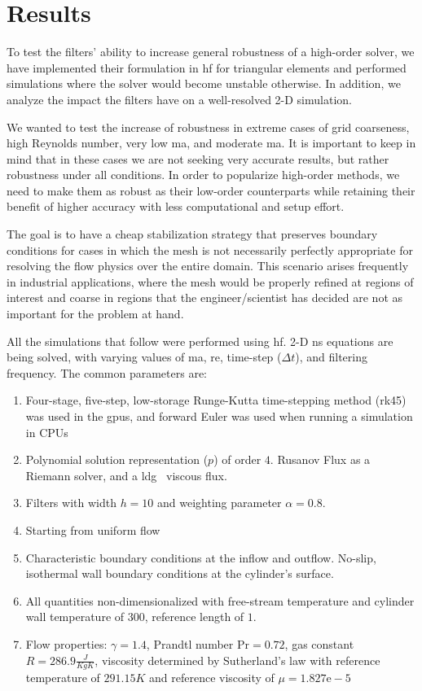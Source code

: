 \section{Results}
\label{sec:results}
To test the filters' ability to increase general robustness of a high-order solver, we have implemented their formulation in \gls{hf} for triangular elements and performed simulations where the solver would become unstable otherwise. In addition, we analyze the impact the filters have on a well-resolved 2-D simulation.

We wanted to test the increase of robustness in extreme cases of grid coarseness, high Reynolds number, very low \gls{ma}, and moderate \gls{ma}. It is important to keep in mind that in these cases we are not seeking very accurate results, but rather robustness under all conditions. In order to popularize high-order methods, we need to make them as robust as their low-order counterparts while retaining their benefit of higher accuracy with less computational and setup effort.

The goal is to have a cheap stabilization strategy that preserves boundary conditions for cases in which the mesh is not necessarily perfectly appropriate for resolving the flow physics over the entire domain. This scenario arises frequently in industrial applications, where the mesh would be properly refined at regions of interest and coarse in regions that the engineer/scientist has decided are not as important for the problem at hand.

All the simulations that follow were performed using \gls{hf}\cite{lopez2014verification}. 2-D \gls{ns} equations are being solved, with varying values of \gls{ma}, \gls{re}, time-step ($\Delta t$), and filtering frequency. The common parameters are:
\begin{enumerate}[1.]
\item Four-stage, five-step, low-storage Runge-Kutta time-stepping method (\gls{rk45}) \cite{carpenter1994fourth} was used in the \gls{gpu}s, and forward Euler was used when running a simulation in CPUs
\item Polynomial solution representation ($p$) of order $4$. Rusanov Flux as a Riemann solver, and a \gls{ldg}~\cite{cockburn1998local} viscous flux.
\item Filters with width $h = 10$ and weighting parameter $\alpha = 0.8$.
\item Starting from uniform flow
\item Characteristic boundary conditions at the inflow and outflow. No-slip, isothermal wall boundary conditions at the cylinder's surface.
\item All quantities non-dimensionalized with free-stream temperature and cylinder wall temperature of $300$, reference length of $1$.
\item Flow properties: $\gamma = 1.4$, Prandtl number $\mathrm{Pr} = 0.72$, gas constant $R = 286.9 \frac{J}{Kg K}$, viscosity determined by Sutherland's law with reference temperature of $291.15 K$ and reference viscosity of $\mu = 1.827\mathrm{e}-5$
\end{enumerate}

